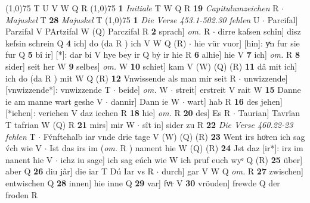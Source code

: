 \documentclass[8pt,a4paper,notitlepage]{article}
\begin{document}
\begin{table}[ht]
\begin{minipage}[t]{0.5\linewidth}
\scriptsize
\line(1,0){75} \newline
T U V W Q R \newline
\line(1,0){75} \newline
\textbf{1} \textit{Initiale} T W Q R  \textbf{19} \textit{Capitulumzeichen} R   $\cdot$ \textit{Majuskel} T  \textbf{28} \textit{Majuskel} T  \newline
\line(1,0){75} \newline
\textbf{1} \textit{Die Verse 453.1-502.30 fehlen} U   $\cdot$ Parcifal] Parzifal V PArtzifal W (Q) Parczifal R \textbf{2} sprach] \textit{om.} R  $\cdot$ dirre kafsen schîn] disz kefsin schrein Q \textbf{4} ich] do (da R ) ich V W Q (R)  $\cdot$ hie vür vuor] [hin]: yͯn fur sie fur Q \textbf{5} bî ir] [*]: dar bi V hye bey ir Q bẏ ir hie R \textbf{6} alhie] hie V \textbf{7} ich] \textit{om.} R \textbf{8} sider] seit her W \textbf{9} selbes] \textit{om.} W \textbf{10} schiet] kam V (W) (Q) (R) \textbf{11} dâ mit ich] ich do (da R ) mit W Q (R) \textbf{12} Vnwissende als man mir seit R  $\cdot$ unwizzende] [vnwizzende*]: vnwizzende T  $\cdot$ beide] \textit{om.} W  $\cdot$ streit] erstreit V rait W \textbf{15} Danne ie am manne wart geshe V  $\cdot$ dannir] Dann ie W  $\cdot$ wart] hab R \textbf{16} des jehen] [*iehen]: veriehen V daz iechen R \textbf{18} hie] \textit{om.} R \textbf{20} des] Es R  $\cdot$ Taurian] Tavrîan T tafrian W (Q) R \textbf{21} mirs] mir W  $\cdot$ sît in] sider zu R \textbf{22} \textit{Die Verse 460.22-23 fehlen} T   $\cdot$ Fv́nftehalb iar vnde drie tage V (W) (Q) (R) \textbf{23} Went irs hoͤren ich sag v́ch wie V  $\cdot$ Ist das irs im (\textit{om.} R ) nament hie W (Q) (R) \textbf{24} Jst daz [ir*]: irz im nanent hie V  $\cdot$ ichz iu sage] ich sag eúch wie W ich pruf euch wyᵉ Q (R) \textbf{25} über] aber Q \textbf{26} diu jâr] die iar T Dú Iar vs R  $\cdot$ durch] gar V W Q \textit{om.} R \textbf{27} zwischen] entwischen Q \textbf{28} innen] hie inne Q \textbf{29} var] fvͦr V \textbf{30} vröuden] frewde Q der froden R \newline
\end{minipage}
\end{table}
\end{document}
